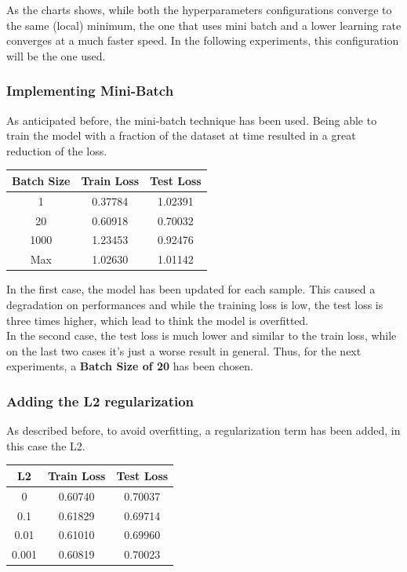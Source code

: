 \documentclass[
	letterpaper, %
	10pt, %
]{class}
\begin{document}
As the charts shows, while both the hyperparameters configurations converge to the same (local) minimum, the one that uses mini batch and a lower learning rate converges at a much faster speed.
In the following experiments, this configuration will be the one used.

\subsubsection{Implementing Mini-Batch}

As anticipated before, the mini-batch technique has been used. Being able to train the model with a fraction of the dataset at time resulted in a great reduction of the loss.

\begin{center}
    \begin{tabular}{ |c|c|c| }
        \hline
        Batch Size & Train Loss & Test Loss \\
        \hline
        1          & 0.37784    & 1.02391   \\
        20         & 0.60918    & 0.70032   \\
        1000       & 1.23453    & 0.92476   \\
        Max        & 1.02630    & 1.01142   \\
        \hline
    \end{tabular}
\end{center}

In the first case, the model has been updated for each sample. This caused a degradation on performances and while the training loss is low, the test loss is three times higher, which lead to think the model is overfitted.\\

In the second case, the test loss is much lower and similar to the train loss, while on the last two cases it's just a worse result in general. Thus, for the next experiments, a \textbf{Batch Size of 20} has been chosen.

\subsubsection{Adding the L2 regularization}

As described before, to avoid overfitting, a regularization term has been added, in this case the L2.

\begin{center}
    \begin{tabular}{ |c|c|c| }
        \hline
        L2    & Train Loss & Test Loss \\
        \hline
        0     & 0.60740    & 0.70037   \\
        0.1   & 0.61829    & 0.69714   \\
        0.01  & 0.61010    & 0.69960   \\
        0.001 & 0.60819    & 0.70023   \\
        \hline
    \end{tabular}
\end{center}
\end{document}
